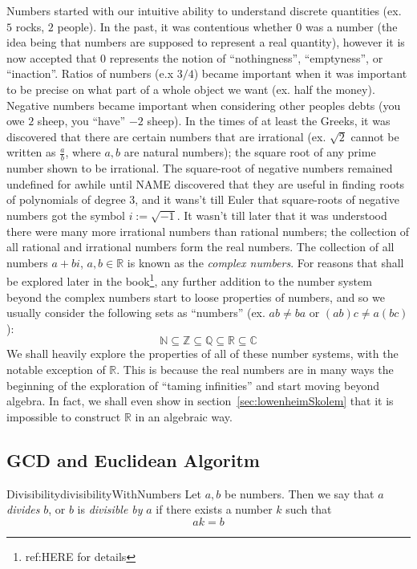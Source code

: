\documentclass{book}
\newcommand{\C}{{\mathbb{C}}}
\newcommand{\N}{{\mathbb{N}}}
\newcommand{\Q}{{\mathbb{Q}}}
\newcommand{\R}{{\mathbb{R}}}
\newcommand{\Z}{{\mathbb{Z}}}
\newcommand{\sse}{\subseteq}
\begin{document}
Numbers started with our intuitive ability to understand discrete quantities (ex. $5$ rocks, $2$ people). In
the past, it was contentious whether $0$ was a number (the idea being that numbers are supposed to represent
a real quantity), however it is now accepted that $0$ represents the notion of ``nothingness'', ``emptyness'',
or ``inaction''. Ratios of numbers (e.x $3/4$) became important when it was important to be precise on what
part of a whole object we want (ex. half the money). Negative numbers became important when considering other
peoples debts (you owe $2$ sheep, you ``have'' $-2$ sheep). In the times of at least the Greeks, it was
discovered that there are certain numbers that are irrational (ex. $\sqrt{2}$ cannot be written as
$\frac{a}{b}$,
where $a,b$ are natural numbers); the square root of any prime number shown to be irrational. The square-root of
negative numbers remained undefined for awhile until NAME discovered that they are useful in finding roots of
polynomials of degree 3, and it wans't till Euler that square-roots of negative numbers got the symbol
$i := \sqrt{-1}$. It wasn't till later that it was understood there were many more irrational numbers than
rational numbers; the collection of all rational and irrational numbers form the real numbers. The collection
of all numbers $a+bi$, $a,b \in \R$ is known as the \emph{complex numbers}. For reasons that shall be explored
later in the book\footnote{ref:HERE for details}, any further addition to the number system beyond the
complex numbers start to loose properties of numbers, and so we usually consider the following sets as
``numbers'' (ex. $ab \ne ba$ or $(ab)c \ne a(bc)$):
\[
	\N \sse \Z \sse \Q \sse \R \sse \C
\]
We shall heavily explore the properties of all of these number systems, with the notable exception of $\R$.
This is because the real numbers are in many ways the beginning of the exploration of ``taming infinities''
and start moving beyond algebra. In fact, we shall even show in section~\ref{sec:lowenheimSkolem} that it is
impossible to construct $\R$ in an algebraic way.


\subsection{GCD and Euclidean Algoritm}

\begin{defn}{Divisibility}{divisibilityWithNumbers}
	Let $a,b$ be numbers. Then we say that $a$ \emph{divides} $b$, or $b$ is \emph{divisible by} $a$ if there
	exists a number $k$ such that
	\[
		ak = b
	\]
\end{defn}
\end{document}
